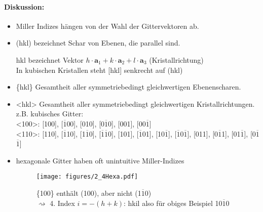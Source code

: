 \begin{itemize}
    \paragraph{Diskussion:}
    \begin{itemize}
        \item Miller Indizes hängen von der Wahl der Gittervektoren ab.
        \item (hkl) bezeichnet Schar von Ebenen, die parallel sind.
        \item [hkl] bezeichnet Vektor $h\cdot \textbf{a}_1 + k \cdot \textbf{a}_2 + l \cdot \textbf{a}_3$ (Kristallrichtung)\\
        In kubischen Kristallen steht [hkl] senkrecht auf (hkl)
        \item \{hkl\} Gesamtheit aller symmetriebedingt gleichwertigen Ebenenscharen.
        \item <hkl> Gesamtheit aller symmetriebedingt gleichwertigen Kristallrichtungen.\\
        z.B. kubisches Gitter:\\
        <100>: [100], [$\overline{1}$00], [010], [0$\overline{1}$0], [001], [00$\overline{1}$]\\
        <110>: [110], [$\overline{1}$10], [1$\overline{1}$0], [$\overline{1}$$\overline{1}$0], [101], [$\overline{1}$01], [10$\overline{1}$], [$\overline{1}$0$\overline{1}$], [011], [0$\overline{1}$1], [01$\overline{1}$], [0$\overline{1}$$\overline{1}$]
        \item hexagonale Gitter haben oft unintuitive Miller-Indizes\\
        \begin{figure}[H]
            \centering
            \texttt{[image: figures/2\_4Hexa.pdf]}
            \caption{\{100\} enthält (100), aber nicht (1$\overline{1}$0)\\
            $\rightsquigarrow$ 4. Index $i = -(h+k)$: hkil also für obiges Beispiel {10$\overline{1}$0}}
            \label{}
        \end{figure}
	\end{itemize}
\end{itemize}
